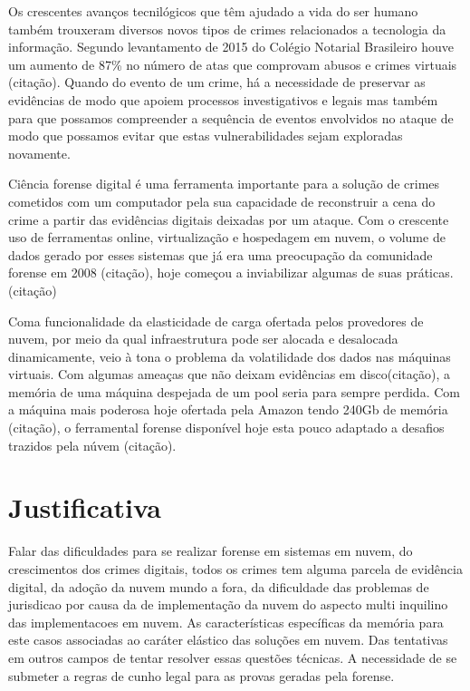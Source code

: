 \documentclass[
	12pt,				%
	openright,			%
	twoside,			%
	a4paper,			%
	english,			%
	french,				%
	spanish,			%
	brazil,				%
	]{abntex2}
\begin{document}
Os crescentes avanços tecnilógicos que têm ajudado a vida do ser humano também trouxeram diversos novos tipos de crimes relacionados a tecnologia da informação. 
Segundo levantamento de 2015 do Colégio Notarial Brasileiro houve um aumento de 87\% no número de atas que comprovam abusos e crimes virtuais (citação).
Quando do evento de um crime, há a necessidade de preservar as evidências de modo que apoiem processos investigativos e legais mas também para que possamos compreender a sequência
de eventos envolvidos no ataque de modo que possamos evitar que estas vulnerabilidades sejam exploradas novamente.

\par

Ciência forense digital é uma ferramenta importante para a solução de crimes cometidos com um computador pela sua capacidade de reconstruir a cena do crime a partir das evidências
digitais deixadas por um ataque. Com o crescente uso de ferramentas online, virtualização e hospedagem em nuvem, o volume de dados gerado por esses sistemas que já era uma preocupação
da comunidade forense em 2008 (citação), hoje começou a inviabilizar algumas de suas práticas. (citação)

\par

Coma funcionalidade da elasticidade de carga ofertada pelos provedores de nuvem, por meio da qual infraestrutura pode ser alocada e desalocada dinamicamente, veio à tona o problema
da volatilidade dos dados nas máquinas virtuais. Com algumas ameaças que não deixam evidências em disco(citação), a memória de uma máquina despejada de um pool seria para sempre
perdida. Com a máquina mais poderosa hoje ofertada pela Amazon tendo 240Gb de memória (citação), o ferramental forense disponível hoje esta pouco adaptado a desafios trazidos 
pela núvem (citação).

\chapter{Justificativa}



Falar das dificuldades para se realizar forense em sistemas em nuvem, do 
crescimentos dos crimes digitais, todos os crimes tem alguma parcela de 
evidência digital, da adoção da nuvem mundo a fora, da dificuldade das 
problemas de jurisdicao por causa da de implementação da nuvem do aspecto multi 
inquilino das implementacoes em nuvem. As características específicas da memória 
para este casos associadas ao caráter elástico das soluções em nuvem. Das 
tentativas em outros campos de tentar resolver essas questões técnicas. A 
necessidade de se submeter a regras de cunho legal para as provas geradas pela 
forense.
\end{document}
